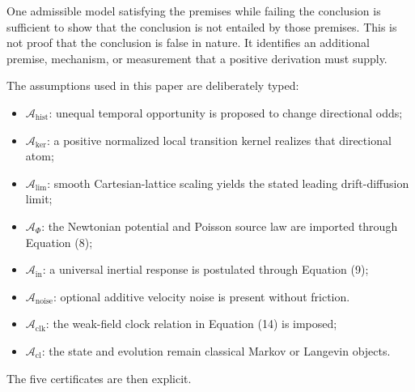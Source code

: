 \documentclass[
  american,
  11pt,
  letterpaper,
]{article}
\providecommand{\tightlist}{%
  \setlength{\itemsep}{0pt}\setlength{\parskip}{0pt}}
\begin{document}
One admissible model satisfying the premises while failing the conclusion is sufficient to show that the conclusion is not entailed by those premises. This is not proof that the conclusion is false in nature. It identifies an additional premise, mechanism, or measurement that a positive derivation must supply.

The assumptions used in this paper are deliberately typed:

\begin{itemize}
\tightlist
\item
  \(\mathcal A_{\mathrm{hist}}\): unequal temporal opportunity is proposed to change directional odds;
\item
  \(\mathcal A_{\mathrm{ker}}\): a positive normalized local transition kernel realizes that directional atom;
\item
  \(\mathcal A_{\mathrm{lim}}\): smooth Cartesian-lattice scaling yields the stated leading drift-diffusion limit;
\item
  \(\mathcal A_{\Phi}\): the Newtonian potential and Poisson source law are imported through Equation (8);
\item
  \(\mathcal A_{\mathrm{in}}\): a universal inertial response is postulated through Equation (9);
\item
  \(\mathcal A_{\mathrm{noise}}\): optional additive velocity noise is present without friction.
\item
  \(\mathcal A_{\mathrm{clk}}\): the weak-field clock relation in Equation (14) is imposed;
\item
  \(\mathcal A_{\mathrm{cl}}\): the state and evolution remain classical Markov or Langevin objects.
\end{itemize}

The five certificates are then explicit.
\end{document}
